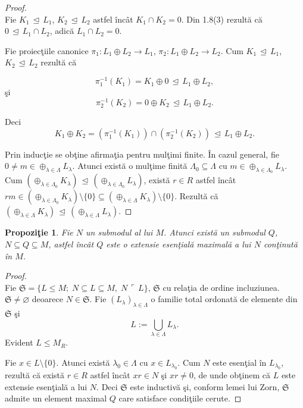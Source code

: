 \documentclass[12pt,a4paper]{book}
\newcommand{\ess}{\trianglelefteq}  %
\theoremstyle{plain}
\newtheorem{proposition}[theorem]{Propoziţie}
\theoremstyle{definition}
\theoremstyle{remark}
\begin{document}
\begin{proof}
\mbox{}\\[0.5em]
Fie \(K_1 \, \ess \, L_1\), \(K_2 \, \ess \, L_2\) astfel încât
\(K_1 \cap K_2 = 0\). Din 1.8(3) rezultă că \(0 \, \ess \, L_1 \cap L_2\),
adică \(L_1 \cap L_2 = 0\).

Fie proiecţiile canonice
\(\pi_1 : L_1 \oplus L_2 \to L_1\),
\(\pi_2 : L_1 \oplus L_2 \to L_2\).
Cum \(K_1 \, \ess \, L_1\), \(K_2 \, \ess \, L_2\) rezultă că

\[
\pi_1^{-1}(K_1)
  = K_1 \oplus 0 \, \ess \, L_1 \oplus L_2,
\]
şi
\[
\pi_2^{-1}(K_2)
  = 0 \oplus K_2 \, \ess \, L_1 \oplus L_2.
\]

Deci
\[
K_1 \oplus K_2
  = (\pi_1^{-1}(K_1)) \cap (\pi_2^{-1}(K_2))
  \, \ess \, L_1 \oplus L_2.
\]

Prin inducţie se obţine afirmaţia pentru mulţimi finite.
În cazul general, fie \(0 \neq m \in \oplus_{\lambda \in \Lambda} L_\lambda\).
Atunci există o mulţime finită \(\Lambda_0 \subseteq \Lambda\)
cu \(m \in \oplus_{\lambda \in \Lambda_0} L_\lambda\).
Cum \((\oplus_{\lambda \in \Lambda_0} K_\lambda) \, \ess \,
(\oplus_{\lambda \in \Lambda_0} L_\lambda)\),
există \(r \in R\) astfel încât
\(rm \in (\oplus_{\lambda \in \Lambda_0} K_\lambda) \setminus \{0\}
\subseteq (\oplus_{\lambda \in \Lambda} K_\lambda) \setminus \{0\}\).
Rezultă că
\((\oplus_{\lambda \in \Lambda} K_\lambda) \, \ess \,
(\oplus_{\lambda \in \Lambda} L_\lambda)\).
\end{proof}


\begin{proposition}
Fie \(N\) un submodul al lui \(M\).
Atunci există un submodul \(Q\), \(N \subseteq Q \subseteq M\),
astfel încât \(Q\) este o extensie esenţială maximală a lui \(N\)
conţinută în \(M\).
\end{proposition}

\begin{proof}
\mbox{}\\[0.5em]
Fie \(\mathfrak{S} = \{ L \leq M ; \; N \subseteq L \subseteq M, \; N \, \ulcorner \, L \}\),
\(\mathfrak{S}\) cu relaţia de ordine incluziunea.
\(\mathfrak{S} \neq \varnothing\) deoarece \(N \in \mathfrak{S}\).
Fie \((L_\lambda)_{\lambda \in \Lambda}\) o familie total ordonată de elemente din
\(\mathfrak{S}\) şi
\[
L := \bigcup_{\lambda \in \Lambda} L_\lambda.
\]
Evident \(L \leq M_R\).

Fie \(x \in L \setminus \{0\}\).
Atunci există \(\lambda_0 \in \Lambda\) cu \(x \in L_{\lambda_0}\).
Cum \(N\) este esenţial în \(L_{\lambda_0}\), rezultă că există \(r \in R\) astfel
încât \(xr \in N\) şi \(xr \neq 0\), de unde obţinem că \(L\) este extensie esenţială
a lui \(N\).
Deci \(\mathfrak{S}\) este inductivă şi, conform lemei lui Zorn, \(\mathfrak{S}\) admite
un element maximal \(Q\) care satisface condiţiile cerute.
\end{proof}
\end{document}
